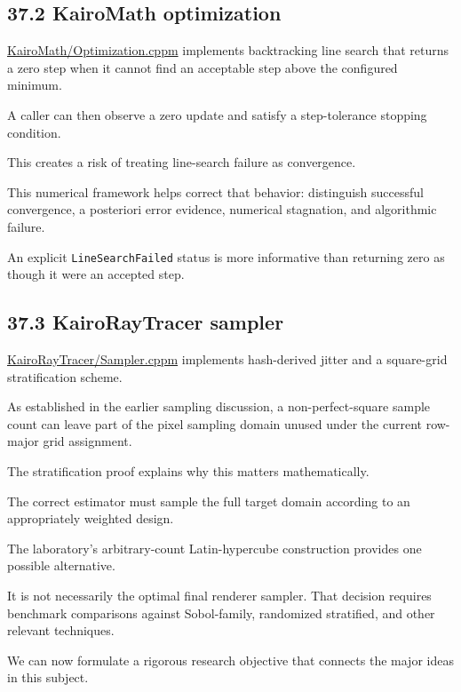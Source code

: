 \subsection{37.2 KairoMath optimization}\label{02-foundations-ii-ch039-kairomath-optimization}

\href{https://github.com/swayam8624/KairoMath/blob/master/Optimization.cppm?utm_source=chatgpt.com}{KairoMath/Optimization.cppm} implements backtracking line search that returns a zero step when it cannot find an acceptable step above the configured minimum.

A caller can then observe a zero update and satisfy a step-tolerance stopping condition.

This creates a risk of treating line-search failure as convergence.

This numerical framework helps correct that behavior: distinguish successful convergence, a posteriori error evidence, numerical stagnation, and algorithmic failure.

An explicit \texttt{LineSearchFailed} status is more informative than returning zero as though it were an accepted step.

\subsection{37.3 KairoRayTracer sampler}\label{02-foundations-ii-ch039-kairoraytracer-sampler}

\href{https://github.com/swayam8624/KairoRayTracer/blob/main/Sampler.cppm?utm_source=chatgpt.com}{KairoRayTracer/Sampler.cppm} implements hash-derived jitter and a square-grid stratification scheme.

As established in the earlier sampling discussion, a non-perfect-square sample count can leave part of the pixel sampling domain unused under the current row-major grid assignment.

The stratification proof explains why this matters mathematically.

The correct estimator must sample the full target domain according to an appropriately weighted design.

The laboratory's arbitrary-count Latin-hypercube construction provides one possible alternative.

It is not necessarily the optimal final renderer sampler. That decision requires benchmark comparisons against Sobol-family, randomized stratified, and other relevant techniques.

We can now formulate a rigorous research objective that connects the major ideas in this subject.

